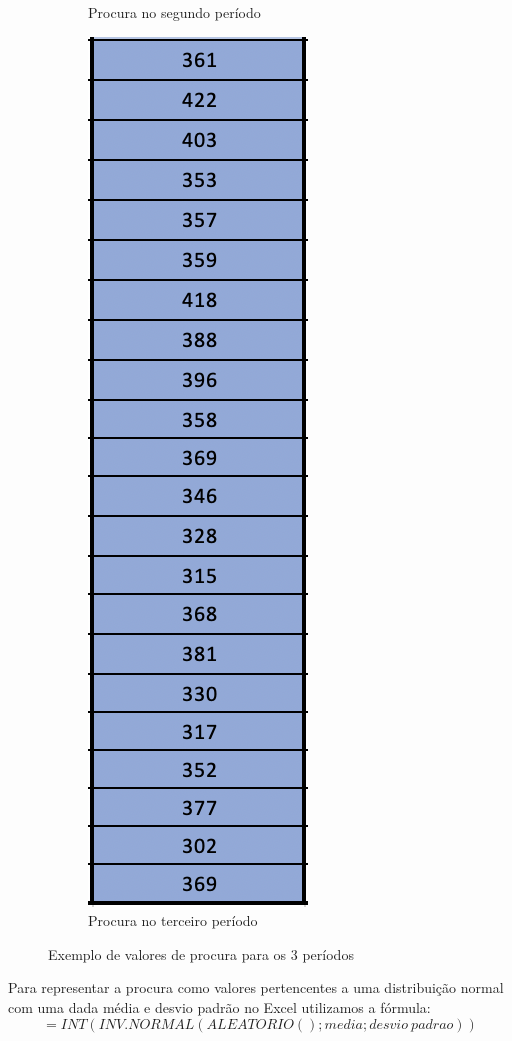\documentclass[a4paper]{article}
\begin{document}
\begin{figure}[H]
\begin{subfigure}[b]{0.3\linewidth}
    \caption{Procura no segundo período}
  \end{subfigure}
  \begin{subfigure}[b]{0.3\linewidth}
    \includegraphics[scale=0.6]{procura_p3.png}
    \caption{Procura no terceiro período}
  \end{subfigure}
  \caption{Exemplo de valores de procura para os 3 períodos}
  \label{fig:proc}
\end{figure}

Para representar a procura como valores pertencentes a uma distribuição normal com uma dada média e desvio padrão no Excel utilizamos a fórmula:  $$ =INT(INV.NORMAL(ALEATORIO(); media ; desvio\ padrao)) $$
\end{document}
